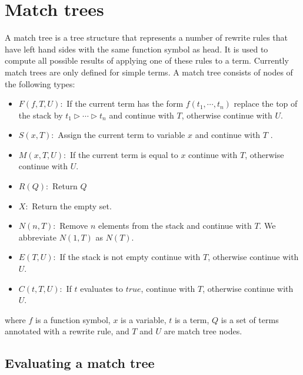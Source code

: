 \documentclass{article}
\begin{document}
\section{Match trees}

A match tree is a tree structure that represents a number of rewrite rules
that have left hand sides with the same function symbol as head. It is used
to compute all possible results of applying one of these rules to a term.
Currently match trees are only defined for simple terms. A match tree
consists of nodes of the following types:

\begin{itemize}
\item $F(f,T,U):$ If the current term has the form $f(t_{1},\cdots ,t_{n})$
replace the top of the stack by $t_{1}\rhd \cdots \rhd t_{n}$ and continue
with $T$, otherwise continue with $U$.

\item $S(x,T):$ Assign the current term to variable $x$ and continue with $T$%
.

\item $M(x,T,U):$ If the current term is equal to $x$ continue with $T$,
otherwise continue with $U$.

\item $R(Q):$ Return $Q$

\item $X:$ Return the empty set.

\item $N(n,T):$ Remove $n$ elements from the stack and continue with $T$. We
abbreviate $N(1,T)$ as $N(T)$.

\item $E(T,U):$ If the stack is not empty continue with $T$, otherwise
continue with $U$.

\item $C(t,T,U):$ If $t$ evaluates to $true$, continue with $T$, otherwise
continue with $U$.
\end{itemize}

where $f$ is a function symbol, $x$ is a variable, $t$ is a term, $Q$ is a
set of terms annotated with a rewrite rule, and $T$ and $U$ are match tree
nodes.

\subsection{Evaluating a match tree}
\end{document}
